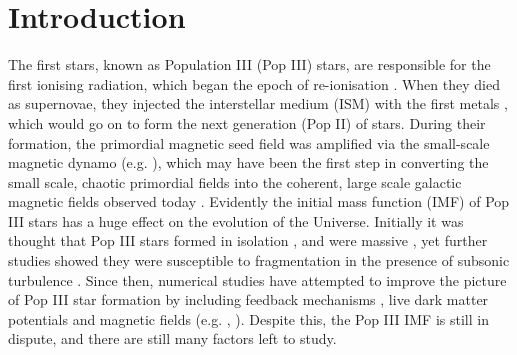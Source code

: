 \documentclass[fleqn,usenatbib]{mnras}
\begin{document}
\section{Introduction}
The first stars, known as Population III (Pop III) stars, are responsible for the first ionising radiation, which began the epoch of re-ionisation \citep{Bromm2001}. When they died as supernovae, they injected the interstellar medium (ISM) with the first metals \citep{Heger2003}, which would go on to form the next generation (Pop II) of stars. During their formation, the primordial magnetic seed field was amplified via the small-scale magnetic dynamo (e.g. \citealt{Schober2012}), which may have been the first step in converting the small scale, chaotic primordial fields into the coherent, large scale galactic magnetic fields observed today \citep{Kulsrud1990}. Evidently the initial mass function (IMF) of Pop III stars has a huge effect on the evolution of the Universe. Initially it was thought that Pop III stars formed in isolation \citep{Haiman1996}, and were massive \citep{Bromm1999}, yet further studies showed they were susceptible to fragmentation in the presence of subsonic turbulence \citep{Clark2011}. Since then, numerical studies have attempted to improve the picture of Pop III star formation by including feedback mechanisms \citep{OShea2008}, live dark matter potentials \citep{Stacy2014} and magnetic fields (e.g. \citealt{Machida2008a}, \citealt{Sharda2020}). Despite this, the Pop III IMF is still in dispute, and there are still many factors left to study.
\end{document}
